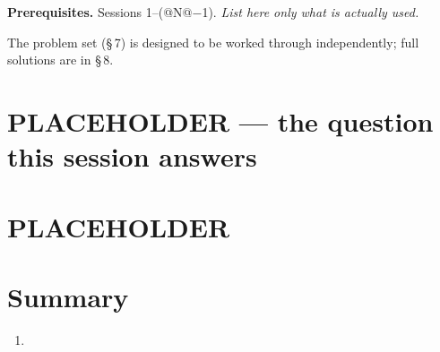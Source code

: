 \documentclass[11pt,a4paper]{article}
\begin{document}

\vspace{6pt}

\begin{keybox}
\textbf{Prerequisites.} Sessions 1--(@N@$-$1). \emph{List here only what is actually used.}

\smallskip
The problem set (§\,7) is designed to be worked through independently; full
solutions are in §\,8.
\end{keybox}

\newpage
\tableofcontents
\newpage

\section{PLACEHOLDER --- the question this session answers}


\section{PLACEHOLDER}

\begin{theorem}\label{th:placeholder}
\end{theorem}


\section{Summary}

\begin{keybox}
\begin{enumerate}[label=\textbf{\arabic*.}, leftmargin=*]
\item
\end{enumerate}
\end{keybox}
\end{document}
